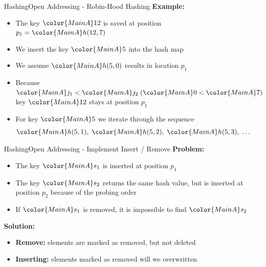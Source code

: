 
\begin{frame}{Hashing}{Open Addressing - Robin-Hood Hashing}
  \textbf{Example:}
  \begin{itemize}
    \item
      The key ${\color{MainA}12}$ is saved at position
      $p_1 = {\color{MainA}h(12, 7)}$
    \item
      We insert the key ${\color{MainA}5}$ into the hash map
    \item
      We assume ${\color{MainA}h(5,0)}$ results in location $p_1$
    \item
      Because
      \begin{math}
        {\color{MainA}j_1} < {\color{MainA}j_2} \;
        ({\color{MainA}0} < {\color{MainA}7})
      \end{math}
      key ${\color{MainA}12}$ stays at position $p_1$
    \item
      For key ${\color{MainA}5}$ we iterate through the 
      sequence
      \begin{displaymath}
        {\color{MainA}h(5, 1)} ,\;
        {\color{MainA}h(5, 2)} ,\;
        {\color{MainA}h(5, 3)} ,\;
        \dots
      \end{displaymath}
  \end{itemize}
\end{frame}


\begin{frame}{Hashing}{Open Addressing - Implement Insert / Remove}
  \textbf{Problem:}
  \begin{itemize}
    \item
      The key ${\color{MainA}s_1}$ is inserted at position $p_1$
    \item
      The key ${\color{MainA}s_2}$ returns the same hash value,
      but is inserted at position $p_2$ because of the probing order
    \item
      If ${\color{MainA}s_1}$ is removed, it is impossible to find
      ${\color{MainA}s_2}$
  \end{itemize}
  \vspace{1.0em}
  \textbf{Solution:}
  \begin{itemize}
    \item<3->
      \textbf{Remove:}
      elements are marked as removed, but not deleted
    \item<4->
      \textbf{Inserting:}
      elements marked as removed will we overwritten
  \end{itemize}
\end{frame}

